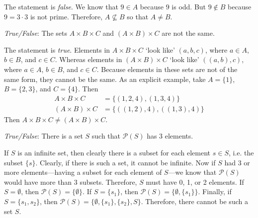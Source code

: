 \documentclass[11pt,letterpaper]{article}
\begin{document}
\sol The statement is \textit{false}. We know that $9 \in A$ because $9$ is odd. But $9 \notin B$ because $9= 3 \cdot 3$ is not prime. Therefore, $A \not\subseteq B$ so that $A \neq B$. \pvspace{1.5cm}



\quizsol \textit{True/False}: The sets $A \times B \times C$ and $(A \times B) \times C$ are not the same. \pspace

\sol The statement is \textit{true}. Elements in $A \times B \times C$ `look like' $(a, b, c)$, where $a \in A$, $b \in B$, and $c \in C$. Whereas elements in $(A \times B) \times C$ `look like' $((a, b), c)$, where $a \in A$, $b \in B$, and $c \in C$. Because elements in these sets are not of the same form, they cannot be the same. As an explicit example, take $A= \{ 1 \}$, $B= \{ 2, 3 \}$, and $C= \{ 4 \}$. Then 
	\[
	\begin{aligned}
	A \times B \times C&= \{ (1, 2, 4), (1, 3, 4) \} \\
	(A \times B) \times C&= \{ ((1, 2), 4), ((1, 3), 4) \}
	\end{aligned}
	\]
Then $A \times B \times C \neq (A \times B) \times C$. 



\newpage



\quizsol \textit{True/False}: There is a set $S$ such that $\mathcal{P}(S)$ has 3 elements. \pspace

\sol If $S$ is an infinite set, then clearly there is a subset for each element $s \in S$, i.e. the subset $\{ s \}$. Clearly, if there is such a set, it cannot be infinite. Now if $S$ had 3 or more elements---having a subset for each element of $S$---we know that $\mathcal{P}(S)$ would have more than 3 subsets. Therefore, $S$ must have 0, 1, or 2 elements. If $S= \emptyset$, then $\mathcal{P}(S)= \{ \emptyset \}$. If $S= \{ s_1 \}$, then $\mathcal{P}(S)= \{ \emptyset, \{ s_1 \} \}$. Finally, if $S= \{ s_1, s_2 \}$, then $\mathcal{P}(S)= \{ \emptyset, \{ s_1 \}, \{ s_2 \}, S \}$. Therefore, there cannot be such a set $S$. 
\end{document}
